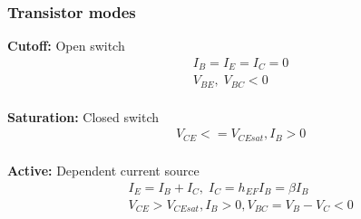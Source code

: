 \documentclass{article}
\begin{document}
\newpage
\subsubsection{Transistor modes}
\noindent\textbf{Cutoff:}
Open switch
\begin{align*}
    &I_B = I_E = I_C = 0 \\
    &V_{BE}, \; V_{BC} < 0 \\
\end{align*}

\noindent\textbf{Saturation:}
Closed switch
\begin{align*}
    &V_{CE} <= V_{CEsat}, I_B>0 \\
\end{align*}

\noindent\textbf{Active:}
Dependent current source
\begin{align*}
    &I_E = I_B + I_C, \; I_C = h_{EF} I_B = \beta I_B \\
    &V_{CE} > V_{CEsat}, I_B>0, V_{BC} = V_B-V_C < 0 \\
\end{align*}


%
%
%
\end{document}
